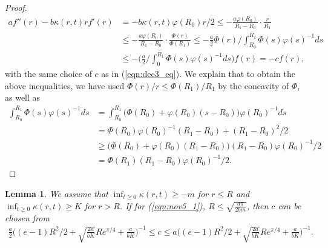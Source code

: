 \documentclass[11pt]{article}
\newtheorem{lemma}[theorem]{Lemma}
\newcommand{\1}{\mathds{1}}
\begin{document}
\begin{proof}
\begin{equation}
    \begin{aligned}
  a f''(r)-b \kappa(r,t) r f'(r)& = -b \kappa(r,t)\varphi(R_0) r/2\leq -\frac{a\varphi(R_0)}{R_1-R_0} \cdot \frac{r}{R_1}\\
  & \leq -\frac{a\varphi(R_0)}{R_1-R_0} \cdot \frac{\Phi(r)}{\Phi(R_1)}\leq -\frac{a}{2}\Phi(r)\Big/\int_{R_0}^{R_1} \Phi(s)\varphi(s)^{-1}ds\\
  & \leq -\Big(\frac{a}{2}\Big/\int_{0}^{R_1} \Phi(s)\varphi(s)^{-1}ds\Big) f(r) = -c f(r),
    \end{aligned}
\end{equation}
with the same choice of $c$ as in (\ref{eqn:dec3_eq}). We explain that to obtain the above inequalities, we have used $\Phi(r)/r\leq \Phi(R_1)/R_1$ by the concavity of $\Phi$, as well as 
\begin{equation*}
    \begin{aligned}
        \int_{R_0}^{R_1} \Phi(s)\varphi(s)^{-1}ds&= \int_{R_0}^{R_1} \big(\Phi(R_0)+\varphi(R_0)(s-R_0)\big)\varphi(R_0)^{-1}ds\\
        &=\Phi(R_0)\varphi(R_0)^{-1} (R_1-R_0)+(R_1-R_0)^2/2\\
        &\geq \big(\Phi(R_0)+\varphi(R_0)(R_1-R_0)\big)(R_1-R_0)\varphi(R_0)^{-1}/2\\
        &= \Phi(R_1)(R_1-R_0)\varphi(R_0)^{-1}/2.
    \end{aligned}
\end{equation*}
\end{proof}
\begin{lemma}\label{lem:appB2}
We assume that $\inf_{t\geq 0}\kappa(r,t)\geq -m$ for $r\leq R$ and $\inf_{t\geq 0}\kappa(r,t)\geq K$ for $r> R$. If for (\ref{eqn:nov5_1}), $R\leq \sqrt{\frac{a\pi}{2bm}}$, then $c$ can be chosen from
\begin{equation}\label{crange}
\begin{aligned}
  \frac{a}{2}\Big((e-1)R^2/2 + \sqrt{\frac{2a}{bK}}Re^{\pi/4}+ \frac{a}{bK} \Big)^{-1} \leq  c\leq a \Big((e-1)R^2/2 + \sqrt{\frac{2a}{bK}}Re^{\pi/4}+ \frac{a}{bK}\Big)^{-1}.
\end{aligned}
\end{equation}
\end{lemma}
\end{document}
